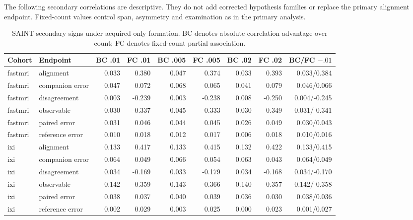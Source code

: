 The following secondary correlations are descriptive. They do not add corrected hypothesis families or replace the primary alignment endpoint. Fixed-count values control span, asymmetry and examination as in the primary analysis.

\begin{table}[t]\centering\scriptsize\caption{SAINT secondary signs under acquired-only formation. BC denotes absolute-correlation advantage over count; FC denotes fixed-count partial association.}\begin{tabular}{llrrrrrrr}\toprule Cohort & Endpoint & BC .01 & FC .01 & BC .005 & FC .005 & BC .02 & FC .02 & BC/FC $-.01$\\\midrule

fastmri & alignment & 0.033 & 0.380 & 0.047 & 0.374 & 0.033 & 0.393 & 0.033/0.384\\

fastmri & companion error & 0.047 & 0.072 & 0.068 & 0.065 & 0.041 & 0.079 & 0.046/0.066\\

fastmri & disagreement & 0.003 & -0.239 & 0.003 & -0.238 & 0.008 & -0.250 & 0.004/-0.245\\

fastmri & observable & 0.030 & -0.337 & 0.045 & -0.333 & 0.030 & -0.349 & 0.031/-0.341\\

fastmri & paired error & 0.031 & 0.046 & 0.044 & 0.045 & 0.026 & 0.049 & 0.030/0.043\\

fastmri & reference error & 0.010 & 0.018 & 0.012 & 0.017 & 0.006 & 0.018 & 0.010/0.016\\

ixi & alignment & 0.133 & 0.417 & 0.133 & 0.415 & 0.132 & 0.422 & 0.133/0.415\\

ixi & companion error & 0.064 & 0.049 & 0.066 & 0.054 & 0.063 & 0.043 & 0.064/0.049\\

ixi & disagreement & 0.034 & -0.169 & 0.033 & -0.179 & 0.034 & -0.168 & 0.034/-0.170\\

ixi & observable & 0.142 & -0.359 & 0.143 & -0.366 & 0.140 & -0.357 & 0.142/-0.358\\

ixi & paired error & 0.038 & 0.037 & 0.040 & 0.039 & 0.036 & 0.030 & 0.038/0.036\\

ixi & reference error & 0.002 & 0.029 & 0.003 & 0.025 & 0.000 & 0.023 & 0.001/0.027\\

\bottomrule\end{tabular}\end{table}

